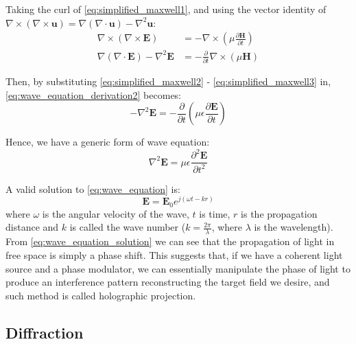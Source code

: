 Taking the curl of \cref{eq:simplified_maxwell1}, and using the vector identity of $\nabla \times (\nabla \times \textbf{u}) = \nabla(\nabla \cdot \textbf{u}) - \nabla^2 \textbf{u}$:
\begin{align}
  \nabla \times (\nabla \times \textbf{E})               & = -\nabla \times (\mu \frac{\partial \textbf{H}}{\partial t}) \label{eq:wave_equation_derivation1} \\
  \nabla (\nabla \cdot \textbf{E}) - \nabla^2 \textbf{E} & = -\frac{\partial}{\partial t} \nabla \times (\mu \textbf{H}) \label{eq:wave_equation_derivation2}
\end{align}

Then, by substituting \cref{eq:simplified_maxwell2} - \cref{eq:simplified_maxwell3} in, \cref{eq:wave_equation_derivation2} becomes:
\begin{equation}
  -\nabla^2 \textbf{E} = -\frac{\partial}{\partial t} (\mu \epsilon \frac{\partial \textbf{E}}{\partial t}) \label{eq:wave_equation_derivation3}
\end{equation}

Hence, we have a generic form of wave equation:
\begin{equation}
  \nabla^2 \textbf{E} = \mu \epsilon \frac{\partial^2 \textbf{E}}{\partial t^2} \label{eq:wave_equation}
\end{equation}

A valid solution to \cref{eq:wave_equation} is:
\begin{equation}
  \textbf{E} = \textbf{E}_0 e^{j(\omega t - k r)} \label{eq:wave_equation_solution}
\end{equation}
where $\omega$ is the angular velocity of the wave, $t$ is time, $r$ is the propagation distance and $k$ is called the wave number ($k=\frac{2\pi}{\lambda}$, where $\lambda$ is the wavelength). From \cref{eq:wave_equation_solution} we can see that the propagation of light in free space is simply a phase shift. This suggests that, if we have a coherent light source and a phase modulator, we can essentially manipulate the phase of light to produce an interference pattern reconstructing the target field we desire, and such method is called holographic projection.


\subsection{Diffraction} \label{sec:Diffraction}

